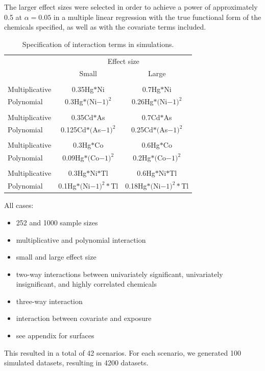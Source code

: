 \documentclass[12pt, twoside]{amherstthesis}
\begin{document}
The larger effect sizes were selected in order to achieve a power of approximately 0.5 at \(\alpha=0.05\) in a multiple linear regression with the true functional form of the chemicals specified, as well as with the covariate terms included.
\begin{table}

\caption{\label{tab:unnamed-chunk-2}Specification of interaction terms in simulations.}
\centering
\begin{tabular}[t]{>{\raggedright\arraybackslash}p{10em}cc}
\toprule
\multicolumn{1}{c}{ } & \multicolumn{2}{c}{Effect size} \\
\cmidrule(l{3pt}r{3pt}){2-3}
 & Small & Large\\
\midrule
\addlinespace[0.3em]
\multicolumn{3}{l}{\textbf{Univariately significant}}\\
\hspace{1em}Multiplicative & 0.35Hg$*$Ni & 0.7Hg$*$Ni\\
\hspace{1em}Polynomial & 0.3Hg$*($Ni$-1)^2$ & 0.26Hg$*($Ni$-1)^2$\\
\addlinespace[0.3em]
\multicolumn{3}{l}{\textbf{Univariately insignificant}}\\
\hspace{1em}Multiplicative & 0.35Cd$*$As & 0.7Cd$*$As\\
\hspace{1em}Polynomial & 0.125Cd$*($As$-1)^2$ & 0.25Cd$*($As$-1)^2$\\
\addlinespace[0.3em]
\multicolumn{3}{l}{\textbf{Highly correlated}}\\
\hspace{1em}Multiplicative & 0.3Hg$*$Co & 0.6Hg$*$Co\\
\hspace{1em}Polynomial & 0.09Hg$*($Co$-1)^2$ & 0.2Hg$*($Co$-1)^2$\\
\addlinespace[0.3em]
\multicolumn{3}{l}{\textbf{Three-way interaction}}\\
\hspace{1em}Multiplicative & 0.3Hg$*$Ni$*$Tl & 0.6Hg$*$Ni$*$Tl\\
\hspace{1em}Polynomial & 0.1Hg$*($Ni$-1)^2*$Tl & 0.18Hg$*($Ni$-1)^2*$Tl\\
\bottomrule
\end{tabular}
\end{table}
All cases:
\begin{itemize}
\item
  252 and 1000 sample sizes
\item
  multiplicative and polynomial interaction
\item
  small and large effect size
\item
  two-way interactions between univariately significant, univariately insignificant, and highly correlated chemicals
\item
  three-way interaction
\item
  interaction between covariate and exposure
\item
  see appendix for surfaces
\end{itemize}
This resulted in a total of 42 scenarios. For each scenario, we generated 100 simulated datasets, resulting in 4200 datasets.
\end{document}
